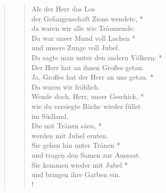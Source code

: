 


\begin{quote}
\begin{verse}


\smallskip

Als der Herr das Los\\
der Gefangenschaft Zions wendete, *\\
da waren wir alle wie Träumende.\\
\vin Da war unser Mund voll Lachen *\\
\vin und unsere Zunge voll Jubel.\\
Da sagte man unter den andern Völkern: *\\
Der Herr hat an ihnen Großes getan.\\
\vin Ja, Großes hat der Herr an uns getan. *\\
\vin Da waren wir fröhlich.\\
Wende doch, Herr, unser Geschick, *\\
wie du versiegte Bäche wieder füllst\\
im Südland.\\
\vin Die mit Tränen säen, *\\
\vin werden mit Jubel ernten.\\
Sie gehen hin unter Tränen *\\
und tragen den Samen zur Aussaat.\\
\vin Sie kommen wieder mit Jubel *\\
\vin und bringen ihre Garben ein.\\!

\end{verse}

\begin{verse}


\smallskip


\end{verse}
\end{quote}

